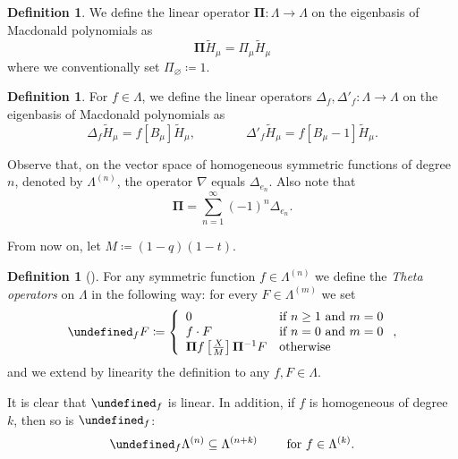 \documentclass[reqno]{amsart}
\theoremstyle{plain}
\theoremstyle{definition}
\newtheorem{definition}[theorem]{Definition}
\theoremstyle{remark}
\newcommand{\Ht}{\widetilde{H}}
\let\oldTheta\Theta
\let\Theta\undefined
\DeclareMathOperator{\Theta}{\oldTheta}
\newcommand{\<}{\langle}
\renewcommand{\>}{\rangle}
\begin{document}
\begin{definition}
    \label{def:pi}
    We define the linear operator $\mathbf{\Pi} \colon \Lambda \rightarrow \Lambda$ on the eigenbasis of Macdonald polynomials as \[ \mathbf{\Pi} \Ht_\mu = \Pi_\mu \Ht_\mu \] where we conventionally set $\Pi_{\varnothing} \coloneqq 1$.
\end{definition}

\begin{definition}
    \label{def:delta}
    For $f \in \Lambda$, we define the linear operators $\Delta_f, \Delta'_f \colon \Lambda \rightarrow \Lambda$ on the eigenbasis of Macdonald polynomials as \[ \Delta_f \Ht_\mu = f[B_\mu] \Ht_\mu, \qquad \qquad \Delta'_f \Ht_\mu = f[B_\mu-1] \Ht_\mu. \]
\end{definition}

Observe that, on the vector space of homogeneous symmetric functions of degree $n$, denoted by $\Lambda^{(n)}$, the operator $\nabla$ equals $\Delta_{e_n}$. Also note that \[ \mathbf{\Pi} = \sum_{n=1}^\infty (-1)^n \Delta_{e_n}. \] 

From now on, let $M \coloneqq (1-q)(1-t)$.

\begin{definition}[{\cite[Equation~(28)]{DAdderioIraciVandenWyngaerd2021ThetaOperators}}]
    \label{def:theta}
    For any symmetric function $f \in \Lambda^{(n)}$ we define the \emph{Theta operators} on $\Lambda$ in the following way: for every $F \in \Lambda^{(m)}$ we set
    \begin{equation*}
        \Theta_f F  \coloneqq
        \left\{\begin{array}{ll}
            0                                                           & \text{if } n \geq 1 \text{ and } m=0 \\
            f \cdot F                                                   & \text{if } n=0 \text{ and } m=0      \\
            \mathbf{\Pi} f \left[\frac{X}{M}\right] \mathbf{\Pi}^{-1} F & \text{otherwise}
        \end{array}
        \right. ,
    \end{equation*}
    and we extend by linearity the definition to any $f, F \in \Lambda$.
\end{definition}

It is clear that $\Theta_f$ is linear. In addition, if $f$ is homogeneous of degree $k$, then so is $\Theta_f$:
\[\Theta_f \Lambda^{(n)} \subseteq \Lambda^{(n+k)} \qquad \text{ for } f \in \Lambda^{(k)}. \]
\end{document}
